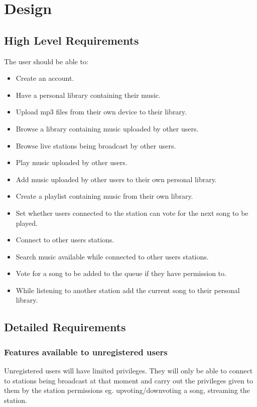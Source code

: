 \documentclass[a4paper, 12pt]{report}
\begin{document}
\chapter{Design}

\section{High Level Requirements}
The user should be able to:
\begin{itemize}
\item Create an account.
\item Have a personal library containing their music.
\item Upload mp3 files from their own device to their library.
\item Browse a library containing music uploaded by other users.
\item Browse live stations being broadcast by other users.
\item Play music uploaded by other users.
\item Add music uploaded by other users to their own personal library. 
\item Create a playlist containing music from their own library.
\item Set whether users connected to the station can vote for the next song to be played.
\item Connect to other users stations.
\item Search music available while connected to other users stations.
\item Vote for a song to be added to the queue if they have permission to.
\item While listening to another station add the current song to their personal library.
\end{itemize}
 
 
\section{Detailed Requirements} 

\subsection{Features available to unregistered users}
Unregistered users will have limited privileges. They will only be able to connect to stations being broadcast at that moment and carry out the privileges given to them by the station permissions eg. upvoting/downvoting a song, streaming the station.
\end{document}
